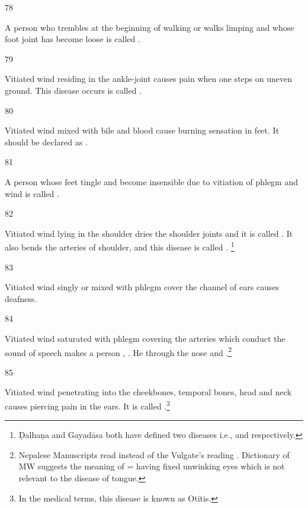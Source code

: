 \begin{translation}
\item[78]

	A person who trembles at the beginning of walking or walks limping and
	whose foot joint has become loose is called
	.

\item[79]

	Vitiated wind residing in the ankle-joint causes pain when one steps on
	uneven ground. This disease occurs is called .

\item[80]

	Vitiated wind mixed with bile and blood cause burning sensation in feet.
	It should be declared as .

\item[81]

	A person whose feet tingle and become insensible due to vitiation of
	phlegm and wind is called .

\item[82]

	Vitiated wind lying in the shoulder dries the shoulder joints and it is
	called . It also bends the arteries of shoulder, and this
	disease is called . \footnote{Ḍalhaṇa and Gayadāsa both have
	defined two diseases i.e.,  and  respectively.}

\item[83]

	Vitiated wind singly or mixed with phlegm cover the channel of ears
	causes deafness.

\item[84]

	Vitiated wind saturated with phlegm covering the arteries which conduct
	the sound of speech makes a person ,
	. He  through the nose and
	.\footnote{Nepalese Manuscripts read 
	instead of the Vulgate’s reading . Dictionary of MW suggests
	the meaning of  = having fixed unwinking eyes which is not
	relevant to the disease of tongue.}

\item[85]

	Vitiated wind penetrating into the cheekbones, temporal bones, head and
	neck causes piercing pain in the ears. It is called
	.\footnote{In the medical terms, this disease is
	known as Otitis.}


\end{translation}
